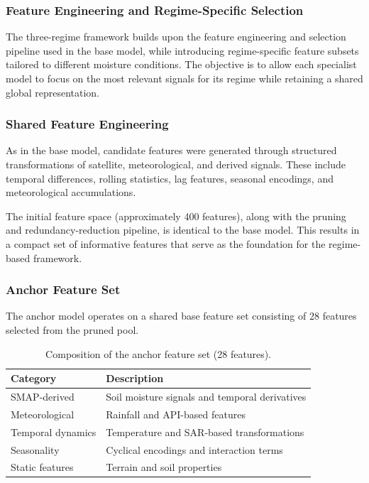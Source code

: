 \subsubsection*{Feature Engineering and Regime-Specific Selection}

The three-regime framework builds upon the feature engineering and selection pipeline used in the base model, while introducing regime-specific feature subsets tailored to different moisture conditions. The objective is to allow each specialist model to focus on the most relevant signals for its regime while retaining a shared global representation.

\subsubsection*{Shared Feature Engineering}

As in the base model, candidate features were generated through structured transformations of satellite, meteorological, and derived signals. These include temporal differences, rolling statistics, lag features, seasonal encodings, and meteorological accumulations.

The initial feature space (approximately 400 features), along with the pruning and redundancy-reduction pipeline, is identical to the base model. This results in a compact set of informative features that serve as the foundation for the regime-based framework.

\subsubsection*{Anchor Feature Set}

The anchor model operates on a shared base feature set consisting of 28 features selected from the pruned pool.

\begin{table}[H]
\centering
\begin{tabular}{ll}
\toprule
\textbf{Category} & \textbf{Description} \\
\midrule
SMAP-derived & Soil moisture signals and temporal derivatives \\
Meteorological & Rainfall and API-based features \\
Temporal dynamics & Temperature and SAR-based transformations \\
Seasonality & Cyclical encodings and interaction terms \\
Static features & Terrain and soil properties \\
\bottomrule
\end{tabular}
\caption{Composition of the anchor feature set (28 features).}
\end{table}

